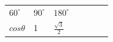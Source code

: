 {{\begin{center}
\begin{tabular}[t]{|l|l|l|l|l|l|l|}
        
                \begin{math}{60}^{\circ }\end{math}
               &
    
    
        
                \begin{math}{90}^{\circ }\end{math}
               &
    
    
        
                \begin{math}{180}^{\circ }\end{math}
     \tabularnewline\cline{1-1}\cline{2-2}\cline{3-3}\cline{4-4}\cline{5-5}\cline{6-6}\cline{7-7}
    
    
        
                \begin{math}cos\theta \end{math}
               &
    
    
        1 &
    
    
        
                \begin{math}\frac{\sqrt{3}}{2}\end{math}
               &
    

\end{tabular}
\end{center}}}
